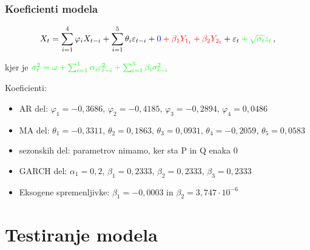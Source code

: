 \documentclass[14p, hyperref={unicode}]{beamer}
\begin{document}
\begin{frame}
    
    \frametitle{Koeficienti modela} 

    \small
    \begin{equation*}
        X_t = \sum_{i=1}^{4}{\varphi_i X_{t-i}} + \sum_{i=1}^{5}{\theta_i \varepsilon_{t-i}} + \color{blue} 0  \color{red}  + \beta_1 Y_{1_{t}} + \beta_2 Y_{2_{t}} \color{black} +  \varepsilon_t \color{green} + \sqrt{\sigma_t} z_t \color{black} \,,
    \end{equation*}

    kjer je $\color{green} \sigma^2_t = \omega + \sum_{i=1}^{1}{\alpha_i \varepsilon_{t-i}^2} + \sum_{i=1}^{3}{\beta_i \sigma_{t-i}^2} \,$
    \normalsize

    \vfill

    Koeficienti:

    \begin{itemize}
        \item  AR del: $\varphi_1 = -0{,}3686,\, \varphi_2 = -0{,}4185,\, \varphi_3 = -0{,2894},\, \varphi_4 = 0{,0486}$
        \item  MA del: $\theta_1 = - 0{,}3311,\, \theta_2 = 0{,}1863,\, \theta_3 = 0{,}0931,\, \theta_4 = -0{,}2059,\, \theta_5 = 0{,}0583$
        \item  sezonskih del: parametrov nimamo, ker sta P in Q enaka $0$
        \item  GARCH del: $\alpha_1 = 0{,}2,\, \beta_1 = 0{,}2333,\, \beta_2 = 0{,}2333,\, \beta_3 = 0{,}2333$
        \item  Eksogene spremenljivke: $\beta_1 = -0{,}0003$ in $\beta_2 = 3{,}747 \cdot 10^{-6}$ 
    \end{itemize}

\end{frame}




\section{Testiranje modela}


\end{document}
